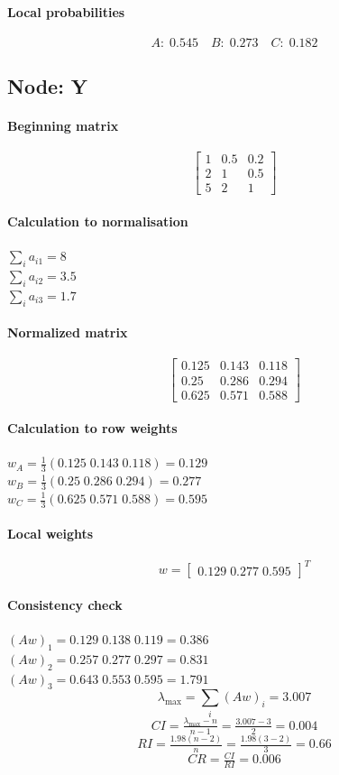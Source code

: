\paragraph{Local probabilities}
\[A:\; 0.545\quad B:\; 0.273\quad C:\; 0.182\]
\subsection*{Node: Y}
\paragraph{Beginning matrix}
\[\begin{bmatrix}
1 & 0.5 & 0.2 \\
2 & 1 & 0.5 \\
5 & 2 & 1
\end{bmatrix}\]
\paragraph{Calculation to normalisation}
\(\sum_i a_{i1} = 8\) \\ \(\sum_i a_{i2} = 3.5\) \\ \(\sum_i a_{i3} = 1.7\)
\paragraph{Normalized matrix}
\[\begin{bmatrix}
0.125 & 0.143 & 0.118 \\
0.25 & 0.286 & 0.294 \\
0.625 & 0.571 & 0.588
\end{bmatrix}\]
\paragraph{Calculation to row weights}
\(w_{A} = \tfrac{1}{3}(0.125 \; 0.143 \; 0.118) = 0.129\) \\ \(w_{B} = \tfrac{1}{3}(0.25 \; 0.286 \; 0.294) = 0.277\) \\ \(w_{C} = \tfrac{1}{3}(0.625 \; 0.571 \; 0.588) = 0.595\)
\paragraph{Local weights}
\[w = \begin{bmatrix} 0.129 \; 0.277 \; 0.595 \end{bmatrix}^{\!T}\]
\paragraph{Consistency check}
\((Aw)_{1} = 0.129 \; 0.138 \; 0.119 = 0.386\) \\ \((Aw)_{2} = 0.257 \; 0.277 \; 0.297 = 0.831\) \\ \((Aw)_{3} = 0.643 \; 0.553 \; 0.595 = 1.791\)
\[\lambda_{\max} = \sum_i (Aw)_i = 3.007\]
\[CI = \tfrac{\lambda_{\max}-n}{n-1} = \tfrac{3.007 - 3}{2} = 0.004\]
\[RI = \tfrac{1.98(n-2)}{n} = \tfrac{1.98(3-2)}{3} = 0.66\]
\[CR = \tfrac{CI}{RI} = 0.006\]
